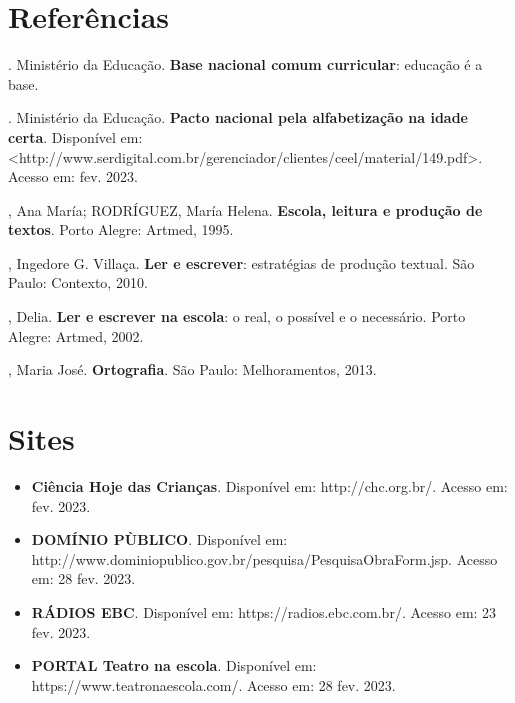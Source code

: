 
\chapter{Referências}

\begin{bibliohedra}
. Ministério da Educação. \textbf{Base nacional comum curricular}:
educação é a base.

. Ministério da Educação. \textbf{Pacto nacional pela
alfabetização na idade certa}. Disponível em:
\textless{}http://www.serdigital.com.br/gerenciador/clientes/ceel/material/149.pdf\textgreater{}.
Acesso em: fev. 2023.

, Ana María; RODRÍGUEZ, María Helena. \textbf{Escola, leitura e
produção de textos}. Porto Alegre: Artmed, 1995.

, Ingedore G. Villaça. \textbf{Ler e escrever}: estratégias de
produção textual. São Paulo: Contexto, 2010.

, Delia. \textbf{Ler e escrever na escola}: o real, o possível e o
necessário. Porto Alegre: Artmed, 2002.

, Maria José. \textbf{Ortografia}. São Paulo: Melhoramentos,
2013.
\end{bibliohedra}

\chapter{Sites}

\begin{itemize}
\item\textbf{Ciência Hoje das Crianças}. Disponível em:
http://chc.org.br/. Acesso em: fev. 2023.

\item\textbf{DOMÍNIO PÙBLICO}. Disponível em:
http://www.dominiopublico.gov.br/pesquisa/PesquisaObraForm.jsp.
Acesso em: 28 fev. 2023.

\item\textbf{RÁDIOS EBC}. Disponível em: https://radios.ebc.com.br/. Acesso
em: 23 fev. 2023.

\item\textbf{PORTAL Teatro na escola}. Disponível em:
https://www.teatronaescola.com/. Acesso em: 28 fev. 2023.
\end{itemize}
